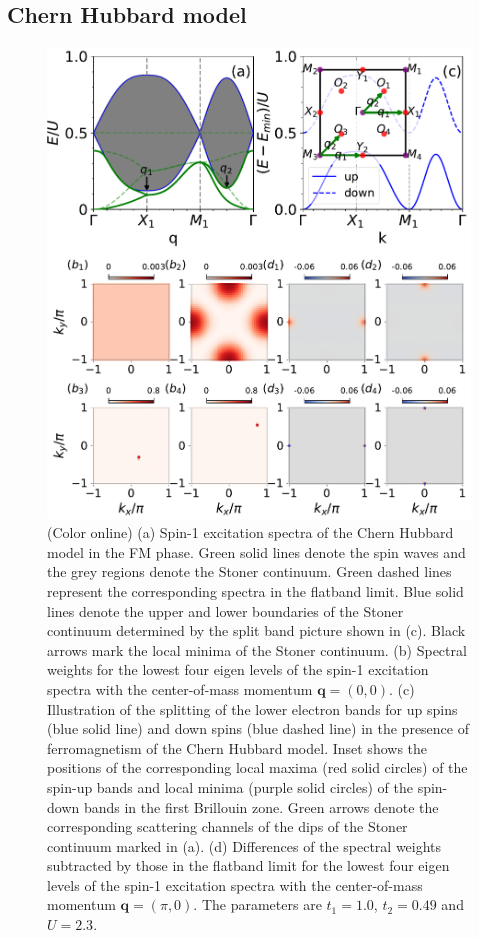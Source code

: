 \documentclass[amsmath,superscriptaddress,showpacs,aps,prb,twocolumn]{revtex4-1}
\begin{document}
\subsection{Chern Hubbard model}
\begin{figure}
\includegraphics[width=\columnwidth]{fmcispectrum}
\caption{(Color online) (a) Spin-1 excitation spectra of the Chern Hubbard model in the FM phase. Green solid lines denote the spin waves and the grey regions denote the Stoner continuum. Green dashed lines represent the corresponding spectra in the flatband limit. Blue solid lines denote the upper and lower boundaries of the Stoner continuum determined by the split band picture shown in (c). Black arrows mark the local minima of the Stoner continuum. (b) Spectral weights for the lowest four eigen levels of the spin-1 excitation spectra with the center-of-mass momentum $\mathbf{q}=(0,0)$. (c) Illustration of the splitting of the lower electron bands for up spins (blue solid line) and down spins (blue dashed line) in the presence of ferromagnetism of the Chern Hubbard model. Inset shows the positions of the corresponding local maxima (red solid circles) of the spin-up bands and local minima (purple solid circles) of the spin-down bands in the first Brillouin zone. Green arrows denote the corresponding scattering channels of the dips of the Stoner continuum marked in (a). (d) Differences of the spectral weights subtracted by those in the flatband limit for the lowest four eigen levels of the spin-1 excitation spectra with the center-of-mass momentum $\mathbf{q}=(\pi,0)$. The parameters are $t_1=1.0$, $t_2=0.49$ and $U=2.3$.}
\label{fmcispectrum}
\end{figure}
\end{document}
